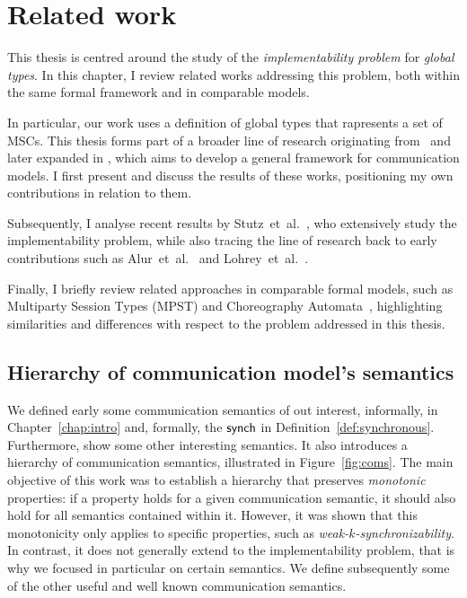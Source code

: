 \chapter{Related work}\label{sec:rel}
This thesis is centred around the study of the \emph{implementability 
problem} for \emph{global types}.
In this chapter, I review related works addressing this problem, 
both within the same formal framework and in comparable models.  

In particular, our work uses a definition of global types that rapresents
a set of MSCs. This thesis forms part of a broader line of research 
originating from~\cite{di2023partial} and later expanded in 
\cite{di2025realisability}, which aims to develop a general framework 
for communication models. I first present and discuss the results of 
these works, positioning my own contributions in relation to them.  

Subsequently, I analyse recent results by 
Stutz~et~al.~\cite{stutz2024implementability}, who extensively study 
the implementability problem, while also tracing the line of research 
back to early contributions such as Alur~et~al.~\cite{alur2000inference} 
and Lohrey~et~al.~\cite{lohrey2003realizability}.  

Finally, I briefly review related approaches in comparable formal 
models, such as Multiparty Session Types (MPST) and Choreography 
Automata~\cite{barbanera2020choreography}, highlighting similarities 
and differences with respect to the problem addressed in this thesis.

\section{Hierarchy of communication model's semantics}\label{sec:hier}
We defined early some communication semantics of out interest, informally, 
in Chapter~\ref{chap:intro} and, formally, the $\mathsf{synch}$ 
in Definition~\ref{def:synchronous}.
Furthermore, \cite{di2023partial} show some other interesting 
semantics. It also introduces a hierarchy of communication
semantics, illustrated in Figure~\ref{fig:coms}. The main objective of
this work was to establish a hierarchy that preserves \emph{monotonic}
properties: if a property holds for a given communication semantic, it
should also hold for all semantics contained within it. However, it was
shown that this monotonicity only applies to specific properties, such
as \emph{weak-$k$-synchronizability}. In contrast, it does not generally
extend to the implementability problem, that is why we focused in particular
on certain semantics. We define subsequently some of the other useful and
well known communication semantics.

